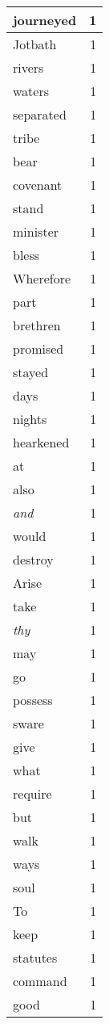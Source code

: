 \begin{center}
\begin{longtable}{l|r}
journeyed & 1 \\ \hline
Jotbath & 1 \\ \hline
rivers & 1 \\ \hline
waters & 1 \\ \hline
separated & 1 \\ \hline
tribe & 1 \\ \hline
bear & 1 \\ \hline
covenant & 1 \\ \hline
stand & 1 \\ \hline
minister & 1 \\ \hline
bless & 1 \\ \hline
Wherefore & 1 \\ \hline
part & 1 \\ \hline
brethren & 1 \\ \hline
promised & 1 \\ \hline
stayed & 1 \\ \hline
days & 1 \\ \hline
nights & 1 \\ \hline
hearkened & 1 \\ \hline
at & 1 \\ \hline
also & 1 \\ \hline
\emph{and} & 1 \\ \hline
would & 1 \\ \hline
destroy & 1 \\ \hline
Arise & 1 \\ \hline
take & 1 \\ \hline
\emph{thy} & 1 \\ \hline
may & 1 \\ \hline
go & 1 \\ \hline
possess & 1 \\ \hline
sware & 1 \\ \hline
give & 1 \\ \hline
what & 1 \\ \hline
require & 1 \\ \hline
but & 1 \\ \hline
walk & 1 \\ \hline
ways & 1 \\ \hline
soul & 1 \\ \hline
To & 1 \\ \hline
keep & 1 \\ \hline
statutes & 1 \\ \hline
command & 1 \\ \hline
good & 1 \\ \hline

\end{longtable}
\end{center}
